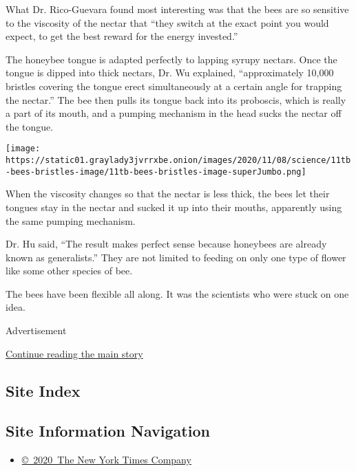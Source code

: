 What Dr. Rico-Guevara found most interesting was that the bees are so
sensitive to the viscosity of the nectar that ``they switch at the exact
point you would expect, to get the best reward for the energy
invested.''

The honeybee tongue is adapted perfectly to lapping syrupy nectars. Once
the tongue is dipped into thick nectars, Dr. Wu explained,
``approximately 10,000 bristles covering the tongue erect simultaneously
at a certain angle for trapping the nectar.'' The bee then pulls its
tongue back into its proboscis, which is really a part of its mouth, and
a pumping mechanism in the head sucks the nectar off the tongue.

\texttt{[image: https://static01.graylady3jvrrxbe.onion/images/2020/11/08/science/11tb-bees-bristles-image/11tb-bees-bristles-image-superJumbo.png]}

When the viscosity changes so that the nectar is less thick, the bees
let their tongues stay in the nectar and sucked it up into their mouths,
apparently using the same pumping mechanism.

Dr. Hu said, ``The result makes perfect sense because honeybees are
already known as generalists.'' They are not limited to feeding on only
one type of flower like some other species of bee.

The bees have been flexible all along. It was the scientists who were
stuck on one idea.

Advertisement

\protect\hyperlink{after-bottom}{Continue reading the main story}

\hypertarget{site-index}{%
\subsection{Site Index}\label{site-index}}

\hypertarget{site-information-navigation}{%
\subsection{Site Information
Navigation}\label{site-information-navigation}}

\begin{itemize}
\tightlist
\item
  \href{https://help.nytimes3xbfgragh.onion/hc/en-us/articles/115014792127-Copyright-notice}{©~2020~The
  New York Times Company}
\end{itemize}

